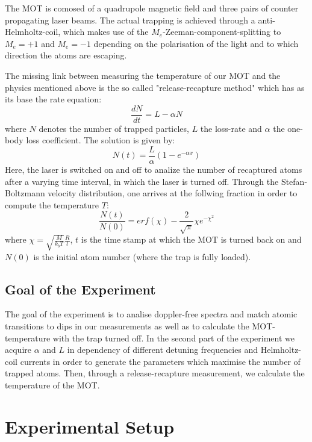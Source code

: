 \documentclass[12pt, a4paper]{article}
\begin{document}
The MOT is comosed of a quadrupole magnetic field and three pairs of counter propagating laser beams.
The actual trapping is achieved through a anti-Helmholtz-coil, which makes use of the $M_e$-Zeeman-component-splitting to $M_e = +1$ and $M_e = -1$ depending on the polarisation of the light and to which direction the atoms are escaping.

The missing link between measuring the temperature of our MOT and the physics mentioned above is the so called "release-recapture method" which has as its base the rate equation:
\begin{equation}
\frac{dN}{dt} = L - \alpha N
\end{equation}
where $N$ denotes the number of trapped particles, $L$ the loss-rate and $\alpha$ the one-body loss coefficient. The solution is given by:
\begin{equation}
N(t) = \frac{L}{\alpha}(1-e^{-\alpha x})
\end{equation}
Here, the laser is switched on and off to analize the number of recaptured atoms after a varying time interval, in which the laser is turned off.
Through the Stefan-Boltzmann velocity distribution, one arrives at the follwing fraction in order to compute the temperature $T$:
\begin{equation}
\frac{N(t)}{N(0)} = erf(\chi) - \frac{2}{\sqrt{\pi}} \chi e^{-\chi ^2}
\end{equation}
where $\chi = \sqrt{\frac{M}{k_{b} T}}\frac{R}{t}$, $t$ is the time stamp at which the MOT is turned back on and $N(0)$ is the initial atom number (where the trap is fully loaded). \cite{script}


\subsection{Goal of the Experiment}
The goal of the experiment is to analise doppler-free spectra and match atomic transitions to dips in our measurements as well as to calculate the MOT-temperature with the trap turned off. In the second part of the experiment we acquire $\alpha$ and $L$ in dependency of different detuning frequencies and Helmholtz-coil currents in order to generate the parameters which maximise the number of trapped atoms. Then, through a release-recapture measurement, we calculate the temperature of the MOT.


\section{Experimental Setup}
\end{document}
